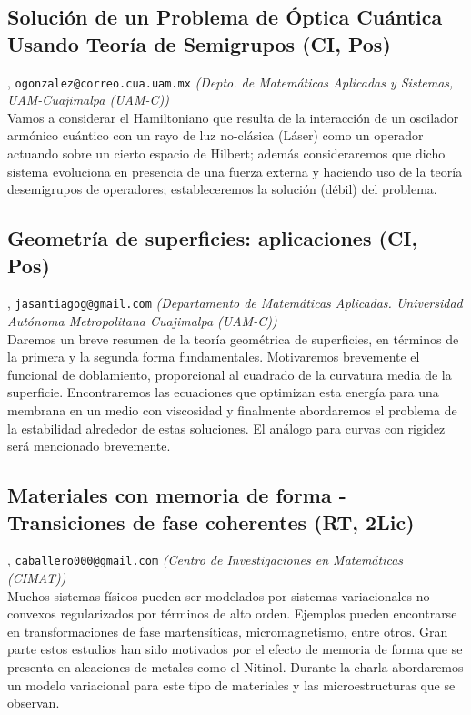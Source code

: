 \subsection{\sffamily Soluci\'on de un Problema de \'Optica Cu\'antica Usando Teor\'ia  de Semigrupos {\footnotesize (CI, Pos)}} \label{reg-1154} 
, {\tt ogonzalez@correo.cua.uam.mx}  {\slshape (Depto. de Matem\'aticas Aplicadas y Sistemas, UAM-Cuajimalpa (UAM-C))}\\
          \noindent Vamos a considerar el Hamiltoniano que resulta de la interacci\'on de un oscilador arm\'onico cu\'antico con un rayo de luz no-cl\'asica (L\'aser) como un operador actuando sobre un cierto espacio de Hilbert; adem\'as consideraremos que dicho sistema evoluciona en presencia de una fuerza externa y haciendo uso de la teor\'ia desemigrupos de operadores; estableceremos la soluci\'on (d\'ebil) del problema.
\subsection{\sffamily Geometr\'ia de superficies: aplicaciones {\footnotesize (CI, Pos)}} \label{reg-1389} 
, {\tt jasantiagog@gmail.com}  {\slshape (Departamento de Matem\'aticas Aplicadas. Universidad Aut\'onoma Metropolitana Cuajimalpa (UAM-C))}\\
          \noindent Daremos un breve resumen de la teor\'ia geom\'etrica de superficies, en t\'erminos de la primera y la segunda forma fundamentales. Motivaremos brevemente el funcional de doblamiento, proporcional al cuadrado de la curvatura media de la superficie. Encontraremos las ecuaciones que optimizan esta energ\'ia para una membrana en un medio con viscosidad y finalmente abordaremos el problema de la estabilidad alrededor de estas soluciones. El an\'alogo para curvas con rigidez ser\'a mencionado brevemente.
\subsection{\sffamily Materiales con memoria de forma - Transiciones de fase coherentes {\footnotesize (RT, 2Lic)}} \label{reg-1319} 
, {\tt caballero000@gmail.com}  {\slshape (Centro de Investigaciones en Matem\'aticas (CIMAT))}\\
          \noindent Muchos sistemas f\'isicos pueden ser modelados por sistemas variacionales no convexos regularizados por t\'erminos de alto orden. Ejemplos pueden encontrarse en transformaciones de fase martens\'iticas, micromagnetismo, entre otros. Gran parte estos estudios han sido motivados por el efecto de memoria de forma que se presenta en aleaciones de metales como el Nitinol. Durante la charla abordaremos un modelo variacional para este tipo de materiales y las microestructuras que se observan.
